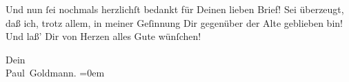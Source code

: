 \pstart
           Und nun ſei nochmals herzlichſt bedankt für Deinen lieben Brief! Sei überzeugt, daß
               ich, trotz allem, in meiner Geſinnung Dir gegenüber der Alte geblieben bin! Und laß’
               Dir von Herzen alles Gute wünſchen!\pend
           
\pstart
           Dein {\\[\baselineskip]}\spacefill\mbox{Paul Goldmann.}\pend
           \leftskip=0em{}\endnumbering{}  
      